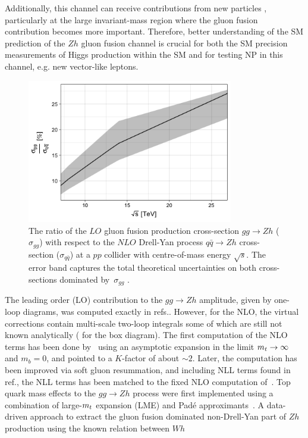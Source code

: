 Additionally, this channel can receive contributions from new particles \cite{Harlander:2013mla}, particularly at the large invariant-mass region where the gluon fusion contribution becomes more important. Therefore, better understanding of the SM prediction of the $Zh$ gluon fusion channel is crucial for both the SM precision measurements of Higgs production within the SM and for testing NP in this channel, e.g. new vector-like leptons.  
\begin{figure}
	\begin{center}
		\includegraphics[width=9cm]{./figures/Rplot}
		\caption{The ratio of the $LO$ gluon fusion production cross-section $ gg \to Zh$  ($\sigma_{gg}$) with respect to the $NLO$ Drell-Yan process $ q\bar{q} \to Zh$ cross-section ($\sigma_{q\bar{q}}$) at a $pp$ collider with centre-of-mass energy $\sqrt{s}$. The error band captures the total theoretical uncertainties on both cross-sections dominated by~$\sigma_{gg}$ .}
		\label{fig:hzratio}
	\end{center}
\end{figure}
\par  The leading order (LO) contribution to the $g g \rightarrow Z h$ amplitude, given by one-loop diagrams, was computed exactly in refs.\cite{Kniehl:1990iva, Dicus:1988yh}. However, for the NLO, the virtual corrections contain multi-scale two-loop integrals some of which are still not known analytically ( for the box diagram).  The first computation of the NLO terms has been done by~\cite{Altenkamp:2012sx} using an asymptotic expansion in the limit
$m_t \rightarrow \infty$ and $m_b = 0$, and pointed to a $K$-factor of about $\sim2$.  Later, the computation has been improved via soft gluon resummation, and including NLL terms found in ref.\cite{Harlander:2014wda}, the NLL terms has been matched to the fixed NLO computation of~\cite{Altenkamp:2012sx}.  Top quark mass effects to the  $g g \rightarrow Zh$ process were first implemented using a combination of  large-$m_t$ expansion (LME) and Pad\'e approximants~\cite{Hasselhuhn:2016rqt}. A data-driven approach to extract the gluon fusion dominated non-Drell-Yan part of $Zh$ production using the known relation between  $Wh$

